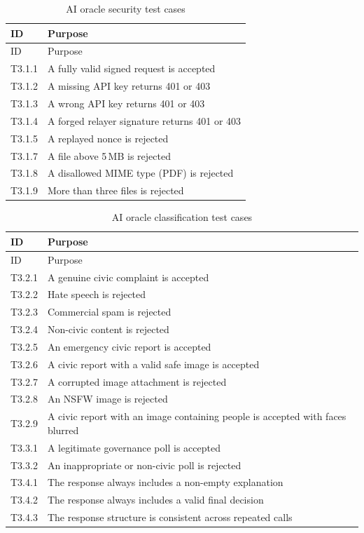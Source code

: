 \begin{longtable}{p{}|p{}}
\caption{AI oracle security test cases} \\

 {ID} &   {Purpose} \\
\hline
\endfirsthead
\hline
  {ID} &   {Purpose} \\
\hline
\endhead
T3.1.1 & A fully valid signed request is accepted \\
\hline
T3.1.2 & A missing API key returns 401 or 403 \\
\hline
T3.1.3 & A wrong API key returns 401 or 403 \\
\hline
T3.1.4 & A forged relayer signature returns 401 or 403 \\
\hline
T3.1.5 & A replayed nonce is rejected \\
\hline
T3.1.7 & A file above 5\,MB is rejected \\
\hline
T3.1.8 & A disallowed MIME type (PDF) is rejected \\
\hline
T3.1.9 & More than three files is rejected \\

\end{longtable}

\begin{longtable}{p{}|p{}}
\caption{AI oracle classification test cases} \\

 {ID} &   {Purpose} \\
\hline
\endfirsthead
\hline
  {ID} &   {Purpose} \\
\hline
\endhead
T3.2.1 & A genuine civic complaint is accepted \\
\hline
T3.2.2 & Hate speech is rejected \\
\hline
T3.2.3 & Commercial spam is rejected \\
\hline
T3.2.4 & Non-civic content is rejected \\
\hline
T3.2.5 & An emergency civic report is accepted \\
\hline
T3.2.6 & A civic report with a valid safe image is accepted \\
\hline
T3.2.7 & A corrupted image attachment is rejected \\
\hline
T3.2.8 & An NSFW image is rejected \\
\hline
T3.2.9 & A civic report with an image containing people is accepted with faces blurred \\
\hline
T3.3.1 & A legitimate governance poll is accepted \\
\hline
T3.3.2 & An inappropriate or non-civic poll is rejected \\
\hline
T3.4.1 & The response always includes a non-empty explanation \\
\hline
T3.4.2 & The response always includes a valid final decision \\
\hline
T3.4.3 & The response structure is consistent across repeated calls \\

\end{longtable}

